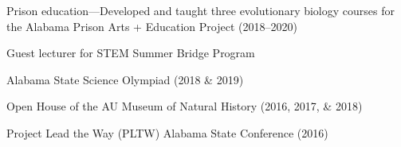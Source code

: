 \begin{veryTightItemize}
    \item Prison education---Developed and taught three evolutionary biology
        courses for the Alabama Prison Arts + Education Project (2018--2020)
    \item Guest lecturer for STEM Summer Bridge Program
    \item Alabama State Science Olympiad (2018 \& 2019)
    \item Open House of the AU Museum of Natural History (2016, 2017, \& 2018)
    \item Project Lead the Way (PLTW) Alabama State Conference (2016)
\end{veryTightItemize}
